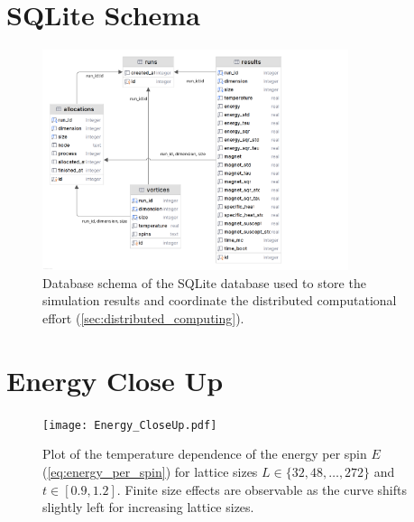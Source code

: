 \section{SQLite Schema}\label{app:schema}
\begin{figure}[H]
	\centering
	\includegraphics[width=0.8\textwidth]{Schema.png}
	\caption{Database schema of the SQLite database used to store the simulation results and coordinate the distributed computational effort (\cref{sec:distributed_computing}).}
	\label{fig:schema}
\end{figure}

\section{Energy Close Up}\label{app:energy:close_up}
\begin{figure}[H]
	\centering
	\texttt{[image: Energy\_CloseUp.pdf]}
	\caption[Close up of the temperature dependence of the energy per spin $E$]{Plot of the temperature dependence of the energy per spin $E$ (\cref{eq:energy_per_spin}) for lattice sizes $L\in\{32, 48, \dots, 272\}$ and $t\in [\num{0.9}, \num{1.2}]$. Finite size effects are observable as the curve shifts slightly left for increasing lattice sizes.}
	\label{fig:energy_per_spin_close_up}
\end{figure}

